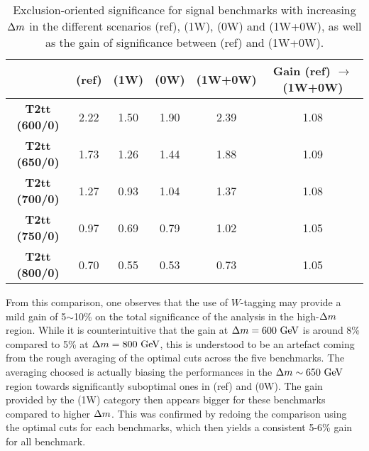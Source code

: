         \begin{table}
            \centering
            \begin{tabular}{c|c|cc|c|c}
                                       & (ref)             & (1W)                         & (0W)                   & (1W+0W) & Gain (ref) $\rightarrow$ (1W+0W)\\
                \hline
                \textbf{T2tt (600/0)}  & 2.22              & 1.50                         & 1.90                   & 2.39    & 1.08 \\
                \textbf{T2tt (650/0)}  & 1.73              & 1.26                         & 1.44                   & 1.88    & 1.09 \\
                \textbf{T2tt (700/0)}  & 1.27              & 0.93                         & 1.04                   & 1.37    & 1.08 \\
                \textbf{T2tt (750/0)}  & 0.97              & 0.69                         & 0.79                   & 1.02    & 1.05 \\
                \textbf{T2tt (800/0)}  & 0.70              & 0.55                         & 0.53                   & 0.73    & 1.05
            \end{tabular}
            \caption{Exclusion-oriented significance for signal benchmarks with increasing
            $\Delta m$ in the different scenarios (ref), (1W), (0W) and (1W+0W),
            as well as the gain of significance between (ref) and (1W+0W).}
            \label{tab:wTaggingSignificanceGain}
        \end{table}

        From this comparison, one observes that the use of $W$-tagging may provide a mild gain of
        5$\sim$10\% on the total significance of the analysis in the high-$\Delta m$ region.
        While it is counterintuitive that the gain at $\Delta m = 600~\text{GeV}$ is around 8\%
        compared to 5\% at $\Delta m = 800~\text{GeV}$, this is understood to be an artefact coming
        from the rough averaging of the optimal cuts across the five benchmarks. The averaging
        choosed is actually biasing the performances in the $\Delta m \sim 650~\text{GeV}$ region
        towards significantly suboptimal ones in (ref) and (0W). The gain provided by the
        (1W) category then appears bigger for these benchmarks compared to higher $\Delta m$.
        This was confirmed by redoing the comparison using the optimal cuts for
        each benchmarks, which then yields a consistent 5-6\% gain for all benchmark.

